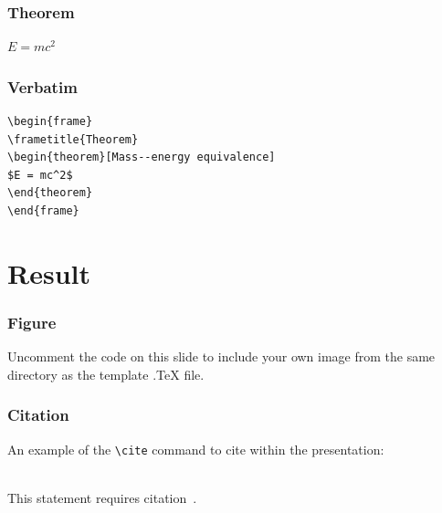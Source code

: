 \documentclass{beamer}
\begin{document}

\begin{frame}
  \frametitle{Theorem}
  \begin{theorem}
    \(E = mc^2\)
  \end{theorem}
\end{frame}


\begin{frame}[fragile] %
  \frametitle{Verbatim}
  \begin{example}
    \begin{verbatim}
\begin{frame}
\frametitle{Theorem}
\begin{theorem}[Mass--energy equivalence]
$E = mc^2$
\end{theorem}
\end{frame}\end{verbatim}
  \end{example}
\end{frame}

\section{Result}
\begin{frame}
  \frametitle{Figure}
  Uncomment the code on this slide to include your own image from the same directory as the template .TeX file.
\end{frame}


\begin{frame}[fragile] %
  \frametitle{Citation}
  An example of the \verb|\cite| command to cite within the presentation:\\~

  This statement requires citation~\cite{shamir2010learning}.
\end{frame}


\end{document}
